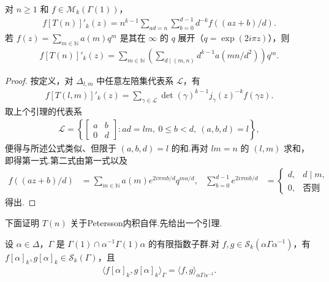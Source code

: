 \begin{lemma*}

对 $n\ge1$ 和 $f\in\mathcal M_k(\Gamma(1))$，
\begin{align*}
f[T(n)]'_k(z)=n^{k-1}\sum_{ad=n}\sum_{b=0}^{d-1}d^{-k}f((az+b)/d).
\end{align*}
若 $f(z)=\sum_{m\in\mathbb N}a(m)q^m$ 是其在 $\infty$ 的 $q$ 展开（$q=\exp(2i\pi z)$），则
\begin{align*}
f[T(n)]'_k(z)=\sum_{m\in\mathbb N}\left(\sum_{d\mid(m,n)}d^{k-1}a(mn/d^2)\right)q^m.
\end{align*}
\end{lemma*}

\begin{proof}

按定义，对 $\Delta_{l,m}$ 中任意左陪集代表系 $\mathcal L$，有
\begin{align*}
f[T(l,m)]'_k(z)=\sum_{\gamma\in\mathcal L}\det(\gamma)^{k-1}j_\gamma(z)^{-k}f(\gamma z).
\end{align*}
取上个引理的代表系
\begin{align*}
\mathcal L=\left\{\begin{bmatrix}a&b\\0&d\end{bmatrix}:ad=lm,\ 0\le b<d,\ (a,b,d)=l\right\},
\end{align*}
便得与所述公式类似、但限于 $(a,b,d)=l$ 的和.再对 $lm=n$ 的 $(l,m)$ 求和，即得第一式.第二式由第一式以及
\begin{align*}
f((az+b)/d)&=\sum_{m\in\mathbb N}a(m)e^{2i\pi mb/d}q^{ma/d},&\sum_{b=0}^{d-1}e^{2i\pi mb/d}&=\begin{cases}d,&d\mid m,\\0,&\text{否则}\end{cases}
\end{align*}
得出.

\end{proof}

下面证明 $T(n)$ 关于Petersson内积自伴.先给出一个引理.

\begin{lemma*}

设 $\alpha\in\Delta$，$\Gamma$ 是 $\Gamma(1)\cap\alpha^{-1}\Gamma(1)\alpha$ 的有限指数子群.对 $f,g\in\mathcal S_k(\alpha\Gamma\alpha^{-1})$，有 $f[\alpha]_k,g[\alpha]_k\in\mathcal S_k(\Gamma)$，且
\begin{align*}
\langle f[\alpha]_k,g[\alpha]_k\rangle_\Gamma=\langle f,g\rangle_{\alpha\Gamma\alpha^{-1}}.
\end{align*}
\end{lemma*}

